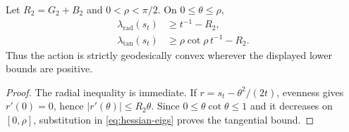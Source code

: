 \begin{corollary}\label{cor:convexity}
Let $R_2=G_2+B_2$ and $0<\rho<\pi/2$.  On $0\le\theta\le\rho$,
\begin{align}
 \lambda_{\mathrm{rad}}(s_t)&\ge t^{-1}-R_2,\label{eq:radial-lower}\\
 \lambda_{\mathrm{tan}}(s_t)&\ge \rho\cot\rho\,t^{-1}-R_2.
 \label{eq:tangential-lower}
\end{align}
Thus the action is strictly geodesically convex wherever the displayed lower
bounds are positive.
\end{corollary}

\begin{proof}
The radial inequality is immediate.  If $r=s_t-\theta^2/(2t)$, evenness gives
$r'(0)=0$, hence $|r'(\theta)|\le R_2\theta$.  Since
$0\le\theta\cot\theta\le1$ and it decreases on $[0,\rho]$, substitution in
\eqref{eq:hessian-eigs} proves the tangential bound.
\end{proof}
